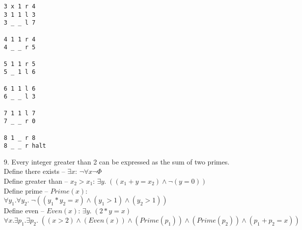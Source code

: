 \documentclass{article}
\begin{document}
\begin{enumerate}
\begin{verbatim}
3 x 1 r 4
3 1 1 l 3
3 _ _ l 7

4 1 1 r 4
4 _ _ r 5

5 1 1 r 5
5 _ 1 l 6

6 1 1 l 6
6 _ _ l 3

7 1 1 l 7
7 _ _ r 0

8 1 _ r 8
8 _ _ r halt
\end{verbatim}

\newpage

\item[9.]
	Every integer greater than 2 can be expressed as the sum of two primes.\\
	
	Define there exists -- $\exists x$: $\neg \forall x \neg \Phi$\\
	
	Define greater than -- $x_2>x_1$: $\exists y. \; ((x_1 + y = x_2) \land \neg (y = 0))$\\
	
	Define prime -- $Prime(x)$: $\forall y_1. \forall y_2. \; \neg ((y_1 * y_2 = x) \land (y_1 > 1) \land (y_2 > 1))$\\
	
	Define even -- $Even(x)$: $\exists y. \; (2 * y = x)$\\
	
	$\forall x. \exists p_1. \exists p_2. \; ((x > 2) \land (Even(x)) \land (Prime(p_1)) \land (Prime(p_2)) \land (p_1 + p_2 = x))$\\

\end{enumerate}
\end{document}
